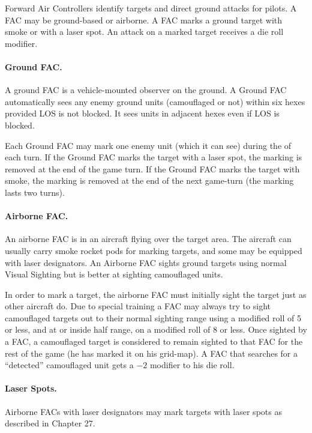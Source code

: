 \begin{advancedrules}

\iffalse
Forward Air Controllers identify targets and direct ground attacks for pilots. A FAC may be ground-based or airborne. A FAC marks a ground target with smoke or with a laser spot. An attack on a marked target receives a  die roll modifier.

\paragraph{Ground FAC.} A ground FAC is a vehicle-mounted observer on the ground. A Ground FAC automatically sees any enemy ground units (camouflaged or not) within six hexes provided LOS is not blocked. It sees units in adjacent hexes even if LOS is blocked.

Each Ground FAC may mark one enemy unit (which it can see) during the  of each turn. If the Ground FAC marks the target with a laser spot, the marking is removed at the end of the game turn. If the Ground FAC marks the target with smoke, the marking is removed at the end of the next game-turn (the marking lasts two turns).

\paragraph{Airborne FAC.} An airborne FAC is in an aircraft flying over the target area. The aircraft can usually carry smoke rocket pods for marking targets, and some may be equipped with laser designators. An Airborne FAC sights ground targets using normal Visual Sighting but is better at sighting camouflaged units.

In order to mark a target, the airborne FAC must initially sight the target just as other aircraft do. Due to special training a FAC may always try to sight camouflaged targets out to their normal sighting range using a modified roll of 5 or less, and at or inside half range, on a modified roll of 8 or less. Once sighted by a FAC, a camouflaged target is considered to remain sighted to that FAC for the rest of the game (he has marked it on his grid-map). A FAC that searches for a “detected” camouflaged unit gets a $-2$ modifier to his die roll.

\paragraph{Laser Spots.} Airborne FACs with laser designators may mark targets with laser spots as described in Chapter 27.


\end{advancedrules}
